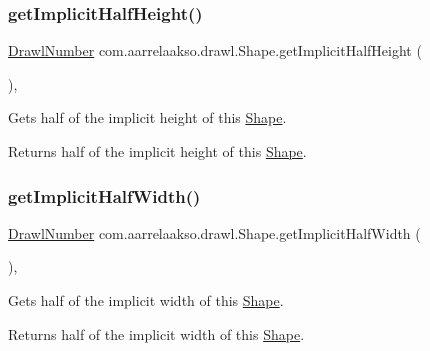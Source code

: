 \subsubsection{\texorpdfstring{get\+Implicit\+Half\+Height()}{getImplicitHalfHeight()}}
{\footnotesize\ttfamily \hyperlink{classcom_1_1aarrelaakso_1_1drawl_1_1_drawl_number}{Drawl\+Number} com.\+aarrelaakso.\+drawl.\+Shape.\+get\+Implicit\+Half\+Height (\begin{DoxyParamCaption}{ }\end{DoxyParamCaption})\hspace{0.3cm}{\ttfamily [protected]}, {\ttfamily [inherited]}}



Gets half of the implicit height of this \hyperlink{classcom_1_1aarrelaakso_1_1drawl_1_1_shape}{Shape}. 

\begin{DoxyReturn}{Returns}
half of the implicit height of this \hyperlink{classcom_1_1aarrelaakso_1_1drawl_1_1_shape}{Shape}. 
\end{DoxyReturn}
\mbox{\label{classcom_1_1aarrelaakso_1_1drawl_1_1_shape_ac796f934debb4cf92d285f387422deb6}} 
\subsubsection{\texorpdfstring{get\+Implicit\+Half\+Width()}{getImplicitHalfWidth()}}
{\footnotesize\ttfamily \hyperlink{classcom_1_1aarrelaakso_1_1drawl_1_1_drawl_number}{Drawl\+Number} com.\+aarrelaakso.\+drawl.\+Shape.\+get\+Implicit\+Half\+Width (\begin{DoxyParamCaption}{ }\end{DoxyParamCaption})\hspace{0.3cm}{\ttfamily [protected]}, {\ttfamily [inherited]}}



Gets half of the implicit width of this \hyperlink{classcom_1_1aarrelaakso_1_1drawl_1_1_shape}{Shape}. 

\begin{DoxyReturn}{Returns}
half of the implicit width of this \hyperlink{classcom_1_1aarrelaakso_1_1drawl_1_1_shape}{Shape}. 
\end{DoxyReturn}
\mbox{\label{classcom_1_1aarrelaakso_1_1drawl_1_1_shape_a41cc097acddea53404b62a812ef37276}} 
